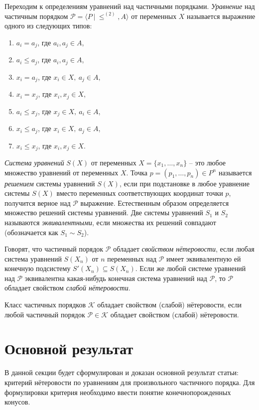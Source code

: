 \documentclass[12pt]{article}
\theoremstyle{break}
\def\P{\mathcal{P}}
\begin{document}
		Переходим к определениям уравнений над частичными порядками. \textit{Уравнение} над частичным порядком $\P = \langle P~|~\leqslant^{(2)}, A\rangle$ от переменных $X$ называется выражение одного из следующих типов:
		\begin{enumerate}
			\item $a_i=a_j$, где $a_i, a_j\in A$,
			\item $a_i\leqslant a_j$, где $a_i, a_j\in A$,
			\item $x_i=a_j$, где $x_i\in X,~a_j\in A$,
			\item $x_i=x_j$, где $x_i, x_j\in X$,
			\item $a_i\leqslant x_j$, где $x_j\in X,~a_i\in A$,
			\item $x_i\leqslant a_j$, где $x_i\in X,~a_j\in A$,
			\item $x_i\leqslant x_j$, где $x_i, x_j\in X$.
		\end{enumerate}

		\textit{Система уравнений} $S(X)$ от переменных $X=\{x_1,\dots,x_n\}$ -- это любое множество уравнений от переменных $X$. Точка $p=(p_1,\dots,p_n)\in P^n$ называется \textit{решением} системы уравнений $S(X)$, если при подстановке в любое уравнение системы $S(X)$ вместо переменных соответствующих координат точки $p$, получится верное над $\P$ выражение. Естественным образом определяется множество решений системы уравнений. Две системы уравнений $S_1$ и $S_2$ называются \textit{эквивалентными}, если множества их решений совпадают (обозначается как $S_1\sim S_2$).
		
		
		Говорят, что частичный порядок $\P$ обладает \textit{свойством нётеровости}, если любая система уравнений $S(X_n)$ от $n$ переменных над $\P$ имеет эквивалентную ей конечную подсистему $S'(X_n) \subseteq S(X_n)$. Если же любой системе уравнений над $\P$ эквивалентна какая-нибудь конечная система уравнений над $\P$, то $\P$ обладает свойством \textit{слабой нётеровости}.
		
		Класс частичных порядков $\mathcal{K}$ обладает свойством (слабой) нётеровости, если любой частичный порядок $\P \in \mathcal{K}$ обладает свойством (слабой) нётеровости.
		
	
	\section{Основной результат}
		В данной секции будет сформулирован и доказан основной результат статьи: критерий нётеровости по уравнениям для произвольного частичного порядка. Для формулировки критерия необходимо ввести понятие конечнопорожденных конусов.
\end{document}
